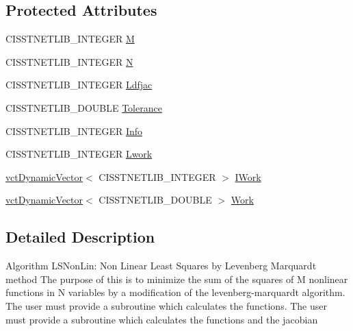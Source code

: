 \subsection*{Protected Attributes}
\begin{DoxyCompactItemize}
\item 
C\+I\+S\+S\+T\+N\+E\+T\+L\+I\+B\+\_\+\+I\+N\+T\+E\+G\+E\+R \hyperlink{classnmr_l_s_non_lin_jacobian_solver_a1d5bdcef6ad8ae1f9a7819c9a0c9d2db}{M}
\item 
C\+I\+S\+S\+T\+N\+E\+T\+L\+I\+B\+\_\+\+I\+N\+T\+E\+G\+E\+R \hyperlink{classnmr_l_s_non_lin_jacobian_solver_a50c6b56a17774e8eaaf37be19419f9b2}{N}
\item 
C\+I\+S\+S\+T\+N\+E\+T\+L\+I\+B\+\_\+\+I\+N\+T\+E\+G\+E\+R \hyperlink{classnmr_l_s_non_lin_jacobian_solver_a128aeda345f8579df433e9b34f4722a5}{Ldfjac}
\item 
C\+I\+S\+S\+T\+N\+E\+T\+L\+I\+B\+\_\+\+D\+O\+U\+B\+L\+E \hyperlink{classnmr_l_s_non_lin_jacobian_solver_ad2dd832ff0445b614dd62570e1b3c43d}{Tolerance}
\item 
C\+I\+S\+S\+T\+N\+E\+T\+L\+I\+B\+\_\+\+I\+N\+T\+E\+G\+E\+R \hyperlink{classnmr_l_s_non_lin_jacobian_solver_af1dcb7219deab0bfce93e95fa0fa71b1}{Info}
\item 
C\+I\+S\+S\+T\+N\+E\+T\+L\+I\+B\+\_\+\+I\+N\+T\+E\+G\+E\+R \hyperlink{classnmr_l_s_non_lin_jacobian_solver_a1fe3dba4bb43fa237bb23ee2f39b2e16}{Lwork}
\item 
\hyperlink{classvct_dynamic_vector}{vct\+Dynamic\+Vector}$<$ C\+I\+S\+S\+T\+N\+E\+T\+L\+I\+B\+\_\+\+I\+N\+T\+E\+G\+E\+R $>$ \hyperlink{classnmr_l_s_non_lin_jacobian_solver_a930eeb596c4ab9904652bc239879918f}{I\+Work}
\item 
\hyperlink{classvct_dynamic_vector}{vct\+Dynamic\+Vector}$<$ C\+I\+S\+S\+T\+N\+E\+T\+L\+I\+B\+\_\+\+D\+O\+U\+B\+L\+E $>$ \hyperlink{classnmr_l_s_non_lin_jacobian_solver_ac686feb241cffda475935e624c67d1bc}{Work}
\end{DoxyCompactItemize}


\subsection{Detailed Description}
Algorithm L\+S\+Non\+Lin\+: Non Linear Least Squares by Levenberg Marquardt method The purpose of this is to minimize the sum of the squares of M nonlinear functions in N variables by a modification of the levenberg-\/marquardt algorithm. The user must provide a subroutine which calculates the functions. The user must provide a subroutine which calculates the functions and the jacobian

